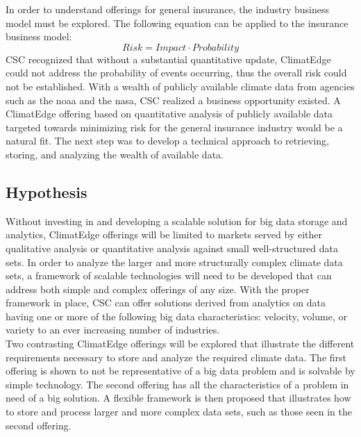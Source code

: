 In order to understand offerings for general insurance, the industry business model must be explored. The following equation can be applied to the insurance  business model: 
\begin{equation*}
    Risk = Impact \cdot Probability
\end{equation*}
\textsc{CSC} recognized that without a substantial quantitative update, ClimatEdge could not address the probability of events occurring, thus the overall risk could not be established. With a wealth of publicly available climate data from agencies such as the \gls{noaa} and the \gls{nasa}, \textsc{CSC} realized a business opportunity existed. A ClimatEdge offering based on quantitative analysis of publicly available data targeted towards minimizing risk for the general insurance industry would be a natural fit. The next step was to develop a technical approach to retrieving, storing, and analyzing the wealth of available data. 
\subsection{Hypothesis}
Without investing in and developing a scalable solution for big data  storage and analytics, ClimatEdge offerings will be limited to markets served by either qualitative analysis or quantitative analysis against small well-structured data sets. In order to analyze the larger and more structurally complex climate data sets, a framework of scalable technologies will need to be developed that can address both simple and complex offerings of any size. With the proper framework in place, \textsc{CSC} can offer solutions derived from analytics on data having one or more of the following big data characteristics: velocity, volume, or variety to an ever increasing number of industries.\\
 
Two contrasting ClimatEdge offerings will be explored that illustrate the different requirements necessary to store and analyze the required climate data. The first offering is shown to not be representative of a big data problem and is solvable by simple technology. The second offering has all the characteristics of a problem in need of a big solution. A flexible framework is then proposed that illustrates how to store and process larger and more complex data sets, such as those seen in the second offering.
